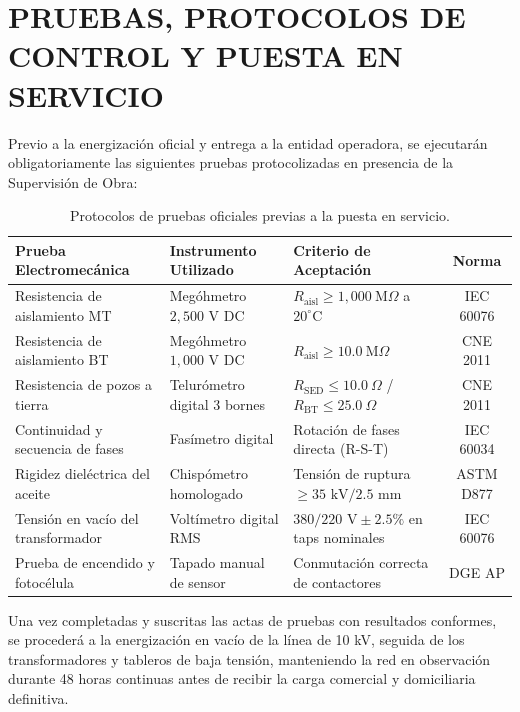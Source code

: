 \section{PRUEBAS, PROTOCOLOS DE CONTROL Y PUESTA EN SERVICIO}

Previo a la energización oficial y entrega a la entidad operadora, se ejecutarán obligatoriamente las siguientes pruebas protocolizadas en presencia de la Supervisión de Obra:

\begin{table}[H]
\centering
\small
\begin{tabular}{|l|l|l|c|}
\hline
\textbf{Prueba Electromecánica} & \textbf{Instrumento Utilizado} & \textbf{Criterio de Aceptación} & \textbf{Norma} \\
\hline
Resistencia de aislamiento MT & Megóhmetro $2,500\text{ V DC}$ & $R_{\text{aisl}} \ge 1,000\ \text{M}\Omega$ a $20^\circ\text{C}$ & IEC 60076 \\
Resistencia de aislamiento BT & Megóhmetro $1,000\text{ V DC}$ & $R_{\text{aisl}} \ge 10.0\ \text{M}\Omega$ & CNE 2011 \\
Resistencia de pozos a tierra & Telurómetro digital 3 bornes & $R_{\text{SED}} \le 10.0\ \Omega$ / $R_{\text{BT}} \le 25.0\ \Omega$ & CNE 2011 \\
Continuidad y secuencia de fases & Fasímetro digital & Rotación de fases directa (R-S-T) & IEC 60034 \\
Rigidez dieléctrica del aceite & Chispómetro homologado & Tensión de ruptura $\ge 35\text{ kV} / 2.5\text{ mm}$ & ASTM D877 \\
Tensión en vacío del transformador & Voltímetro digital RMS & $380 / 220\text{ V} \pm 2.5\%$ en taps nominales & IEC 60076 \\
Prueba de encendido y fotocélula & Tapado manual de sensor & Conmutación correcta de contactores & DGE AP \\
\hline
\end{tabular}
\caption{Protocolos de pruebas oficiales previas a la puesta en servicio.}
\end{table}

Una vez completadas y suscritas las actas de pruebas con resultados conformes, se procederá a la energización en vacío de la línea de 10 kV, seguida de los transformadores y tableros de baja tensión, manteniendo la red en observación durante 48 horas continuas antes de recibir la carga comercial y domiciliaria definitiva.
